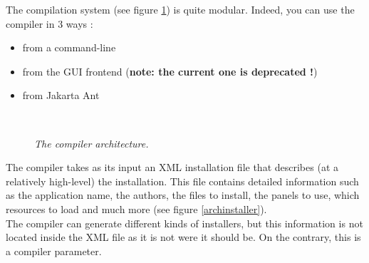 The compilation system (see figure \ref{comparch}) is quite modular. 
Indeed, you can use the compiler in 3 ways :
\begin{itemize}
  \item from a command-line
  \item from the GUI frontend (\textbf{note: the current one is deprecated !})
  \item from Jakarta Ant
\end{itemize}\

\begin{figure}[h]
\caption{\label{comparch}
         \textit{The compiler architecture.}}
\begin{center}
\end{center}
\end{figure}

The compiler takes as its input an XML installation file that describes
(at a relatively high-level) the installation. This file contains
detailed information such as the application name, the authors, the
files to install, the panels to use, which resources to load and much
more (see figure \ref{archinstaller}).\\

The compiler can generate different kinds of installers, but this information is
not located inside the XML file as it is not were it should be. On the contrary,
this is a compiler parameter.\\

